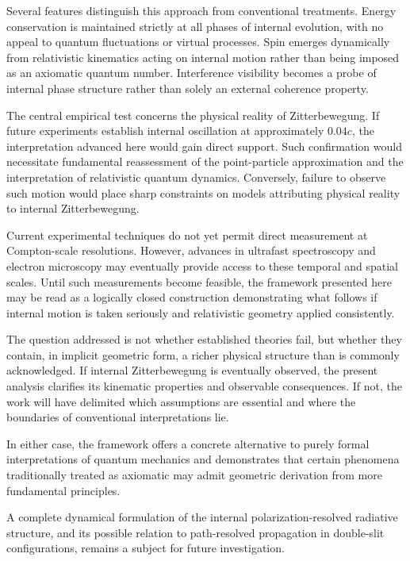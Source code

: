 \documentclass[%
 reprint,
 amsmath,amssymb,
 aps,
 prb,
]{revtex4-2}
\numberwithin{equation}{section}
\begin{document}
Several features distinguish this approach from conventional treatments. Energy conservation is maintained strictly at all phases of internal evolution, with no appeal to quantum fluctuations or virtual processes. Spin emerges dynamically from relativistic kinematics acting on internal motion rather than being imposed as an axiomatic quantum number. Interference visibility becomes a probe of internal phase structure rather than solely an external coherence property.

The central empirical test concerns the physical reality of Zitterbewegung. If future experiments establish internal oscillation at approximately $0.04c$, the interpretation advanced here would gain direct support. Such confirmation would necessitate fundamental reassessment of the point-particle approximation and the interpretation of relativistic quantum dynamics. Conversely, failure to observe such motion would place sharp constraints on models attributing physical reality to internal Zitterbewegung.

Current experimental techniques do not yet permit direct measurement at Compton-scale resolutions. However, advances in ultrafast spectroscopy and electron microscopy may eventually provide access to these temporal and spatial scales. Until such measurements become feasible, the framework presented here may be read as a logically closed construction demonstrating what follows if internal motion is taken seriously and relativistic geometry applied consistently.

The question addressed is not whether established theories fail, but whether they contain, in implicit geometric form, a richer physical structure than is commonly acknowledged. If internal Zitterbewegung is eventually observed, the present analysis clarifies its kinematic properties and observable consequences. If not, the work will have delimited which assumptions are essential and where the boundaries of conventional interpretations lie.

In either case, the framework offers a concrete alternative to purely formal interpretations of quantum mechanics and demonstrates that certain phenomena traditionally treated as axiomatic may admit geometric derivation from more fundamental principles.

A complete dynamical formulation of the internal polarization-resolved radiative structure, and its possible relation to path-resolved propagation in double-slit configurations, remains a subject for future investigation.
\end{document}
